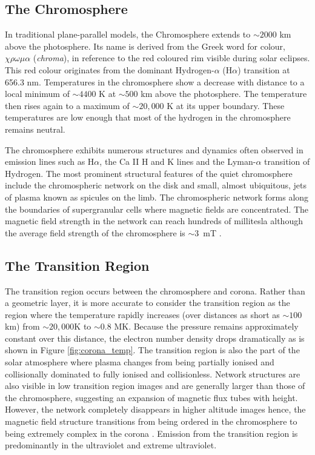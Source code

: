 \subsection{The Chromosphere}
In traditional plane-parallel models, the Chromosphere extends to $\sim 2000$ km above the photosphere. Its name is derived from the Greek word for colour, $\chi \rho \omega \mu \alpha$ (\textit{chroma}), in reference to the red coloured rim visible during solar eclipses. This red colour originates from the dominant Hydrogen-$\alpha$ (H$\alpha$) transition at 656.3 nm. Temperatures in the chromosphere show a decrease with distance to a local minimum of $\sim 4400$ K at $\sim 500$ km above the photosphere. The temperature then rises again to a maximum of $\sim 20,000$ K at its upper boundary. These temperatures are low enough that most of the hydrogen in the chromosphere remains neutral. 

The chromosphere exhibits numerous structures and dynamics often observed in emission lines such as H$\alpha$, the Ca II H and K lines and the Lyman-$\alpha$ transition of Hydrogen. The most prominent structural features of the quiet chromosphere include the chromospheric network on the disk and small, almost ubiquitous, jets of plasma known as spicules on the limb. The chromospheric network forms along the boundaries of supergranular cells where magnetic fields are concentrated. The magnetic field strength in the network can reach hundreds of millitesla although the average field strength of the chromosphere is $\sim 3$~mT \citep{McLean1985}.


\subsection{The Transition Region}
The transition region occurs between the chromosphere and corona. Rather than a geometric layer, it is more accurate to consider the transition region as the region where the temperature rapidly increases (over distances as short as $\sim 100$ km) from $\sim 20,000$K to $\sim 0.8$ MK. Because the pressure remains approximately constant over this distance, the electron number density drops dramatically as is shown in Figure \ref{fig:corona_temp}. The transition region is also the part of the solar atmosphere where plasma changes from being partially ionised and collisionally dominated to fully ionised and collisionless. Network structures are also visible in low transition region images and are generally larger than those of the chromosphere, suggesting an expansion of magnetic flux tubes with height. However, the network completely disappears in higher altitude images hence, the magnetic field structure transitions from being ordered in the chromosphere to being extremely complex in the corona \citep{Tian2017}. Emission from the transition region is predominantly in the ultraviolet and extreme ultraviolet.

